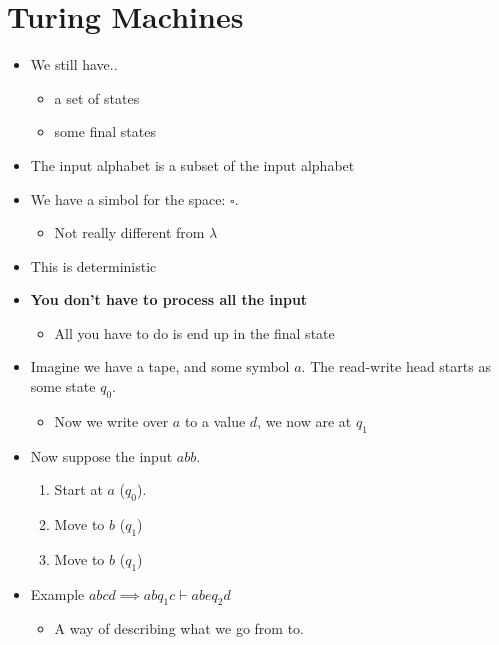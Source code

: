 \documentclass[12pt]{article}
\begin{document}
\section{Turing Machines}

\begin{itemize}
    \item We still have..
    \begin{itemize}
        \item a set of states
        \item some final states
    \end{itemize}

    \item The input alphabet is a subset of the input alphabet
    \item We have a simbol for the space: $\square$.
    \begin{itemize}
        \item Not really different from $\lambda$
    \end{itemize}
    \item This is deterministic
    \item \textbf{You don't have to process all the input}
    \begin{itemize}
        \item All you have to do is end up in the final state
    \end{itemize}

    \item Imagine we have a tape, and some symbol $a$. The read-write head starts as some state $q_0$.
    \begin{itemize}
        \item Now we write over $a$ to a value $d$, we now are at $q_1$
    \end{itemize}

    \item Now suppose the input $abb$.
    \begin{enumerate}
        \item Start at $a$ ($q_0$).
        \item Move to $b$ ($q_1$)
        \item Move to $b$ ($q_1$)
    \end{enumerate}

    \item Example $abcd \implies ab q_1 c \vdash abe q_2 d$
    \begin{itemize}
        \item A way of describing what we go from to.
    \end{itemize}




\end{itemize}
\end{document}
